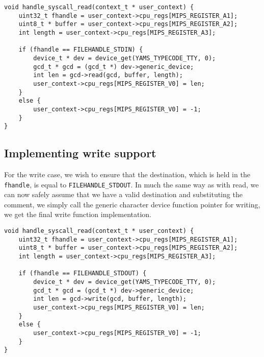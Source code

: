 \documentclass[11pt]{article}
\newcommand{\code}[1]{{\tt #1}}
\begin{document}
\begin{lstlisting}
void handle_syscall_read(context_t * user_context) {
    uint32_t fhandle = user_context->cpu_regs[MIPS_REGISTER_A1];
    uint8_t * buffer = user_context->cpu_regs[MIPS_REGISTER_A2];
    int length = user_context->cpu_regs[MIPS_REGISTER_A3];

    if (fhandle == FILEHANDLE_STDIN) {
        device_t * dev = device_get(YAMS_TYPECODE_TTY, 0);
        gcd_t * gcd = (gcd_t *) dev->generic_device;
        int len = gcd->read(gcd, buffer, length);
        user_context->cpu_regs[MIPS_REGISTER_V0] = len;
    }
    else {
        user_context->cpu_regs[MIPS_REGISTER_V0] = -1;
    }
}
\end{lstlisting}

\subsection{Implementing write support}
For the write case, we wish to ensure that the destination, which is held in
the \code{fhandle}, is equal to \code{FILEHANDLE\_STDOUT}. In much the same
way as with read, we can now safely assume that we have a valid destination
and substituting the comment, we simply call the generic character device
function pointer for writing, we get the final write function implementation.

\begin{lstlisting}
void handle_syscall_read(context_t * user_context) {
    uint32_t fhandle = user_context->cpu_regs[MIPS_REGISTER_A1];
    uint8_t * buffer = user_context->cpu_regs[MIPS_REGISTER_A2];
    int length = user_context->cpu_regs[MIPS_REGISTER_A3];

    if (fhandle == FILEHANDLE_STDOUT) {
        device_t * dev = device_get(YAMS_TYPECODE_TTY, 0);
        gcd_t * gcd = (gcd_t *) dev->generic_device;
        int len = gcd->write(gcd, buffer, length);
        user_context->cpu_regs[MIPS_REGISTER_V0] = len;
    }
    else {
        user_context->cpu_regs[MIPS_REGISTER_V0] = -1;
    }
}
\end{lstlisting}
\end{document}
